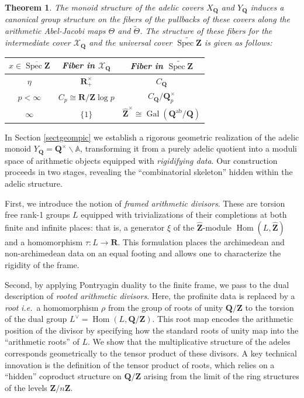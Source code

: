\documentclass[11pt,a4paper]{article}
\newcommand{\Q}{\mathbf{Q}}
\newcommand{\Z}{\mathbf{Z}}
\newcommand{\R}{\mathbf{R}}
\newcommand{\A}{\mathbb{A}}
\newcommand{\Zhat}{\widehat{\Z}}
\def\spz{\Spec \Z}
\def\spzb{\overline{\Spec \Z}}
\newcommand{\Spec}{\operatorname{Spec}}
\def\spz{\Spec \Z}
\def\ie{{\it i.e.\/}\ }
\theoremstyle{plain}
\newtheorem{thm}{Theorem}[section]
\theoremstyle{definition} %
\begin{document}
\begin{thm}\label{thm:fibers}
The monoid structure of the adelic covers  $X_\Q$ and $Y_\Q$ induces a canonical group structure on the fibers of the pullbacks of these covers along the arithmetic Abel-Jacobi maps $\Theta$ and $\tilde\Theta$. The structure of these fibers for the intermediate cover $\mathcal{X}_\Q$  and the universal cover $\widetilde{\spz}$ is given as follows:
\begin{center}
\renewcommand{\arraystretch}{1.5}
\begin{tabular}{c|c|c}
$x \in \spzb$ & \rm{Fiber in} $\mathcal{X}_\Q$ & \rm{Fiber in} $\widetilde{\spz}$ \\
\hline
$\eta$ & $\R_+^\times$ & $C_\Q$  \\
$p<\infty$ & $C_p \cong \R / \Z \log p$ & $C_\Q / \Q_p^\times$ \\
$\infty$ & $\{1\}$ & $\widehat{\Z}^\times \cong \operatorname{Gal}(\Q^{\text{ab}}/\Q)$ \\
\end{tabular}
\end{center}
\end{thm}
In Section \ref{sectgeompic} we establish a rigorous geometric realization of the adelic monoid $Y_\Q = \Q^\times \backslash \A$, transforming it from a purely adelic quotient into a moduli space of arithmetic objects equipped with \emph{rigidifying data}. Our construction proceeds in two stages, revealing the ``combinatorial skeleton'' hidden within the adelic structure.

First, we introduce the notion of \emph{framed arithmetic divisors}. These are torsion free rank-1 groups $L$ equipped with trivializations of their completions at both finite and infinite places: that is, a generator $\xi$ of the $\Zhat$-module $\operatorname{Hom}(L, \Zhat)$ and a homomorphism $\tau: L \to \R$. This formulation places the archimedean and non-archimedean data on an equal footing and allows one to characterize the rigidity of the frame.

Second, by applying Pontryagin duality to the finite frame, we pass to the dual description of \emph{rooted arithmetic divisors}. Here, the profinite data is replaced by a \emph{root} \ie a homomorphism $\rho$ from the group of roots of unity $\Q/\Z$ to the torsion of the dual group $L^\vee = \operatorname{Hom}(L, \Q/\Z)$. This root map encodes the arithmetic position of the divisor by specifying how the standard roots of unity map into the ``arithmetic roots'' of $L$. We show that the multiplicative structure of the adeles corresponds geometrically to the tensor product of these divisors. A key technical innovation is  the definition of the tensor product of roots, which relies on a ``hidden'' coproduct structure on $\Q/\Z$ arising from the limit of the ring structures of the levels $\Z/n\Z$.\vspace{.05in}
\end{document}
